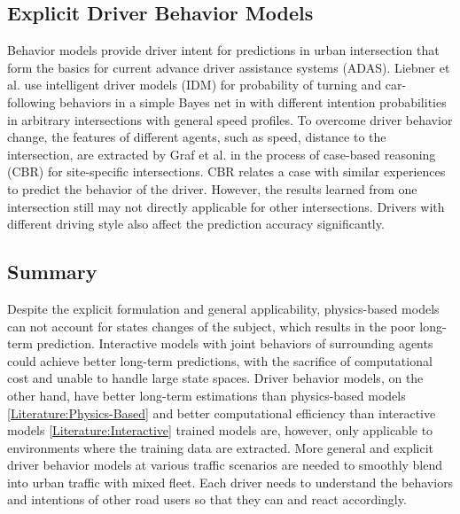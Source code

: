 


\subsection{Explicit Driver Behavior Models}

Behavior models provide driver intent for predictions in urban intersection that form the basics for current advance driver assistance systems (ADAS). Liebner et al. use intelligent driver models (IDM) for probability of turning and car-following behaviors in a simple Bayes net in \cite{Liebner2012} with different intention probabilities in arbitrary intersections with general speed profiles. To overcome driver behavior change, the features of different agents, such as speed, distance to the intersection, are extracted by Graf et al. in the process of case-based reasoning (CBR) for site-specific intersections\cite{Graf2014}. CBR relates a case with similar experiences to predict the behavior of the driver. However, the results learned from one intersection still may not directly applicable for other intersections. Drivers with different driving style also affect the prediction accuracy significantly.   

\subsection{Summary}
Despite the explicit formulation and general applicability, physics-based models can not account for states changes of the subject, which results in the poor long-term prediction. Interactive models with joint behaviors of surrounding agents could achieve better long-term predictions, with the sacrifice of  computational cost and unable to handle large state spaces. Driver behavior models, on the other hand, have better long-term estimations than physics-based models \ref{Literature:Physics-Based} and better computational efficiency than interactive models \ref{Literature:Interactive} trained models are, however, only applicable to environments where the training data are extracted. More general and explicit driver behavior models at various traffic scenarios are needed to smoothly blend into urban traffic with mixed fleet. Each driver needs to understand the behaviors and intentions of other road users so that they can and react accordingly. 


